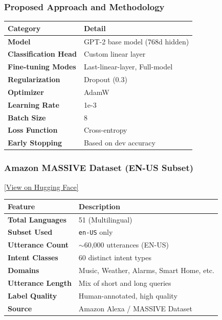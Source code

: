 \documentclass{beamer}
\begin{document}
\begin{frame}
\frametitle{Proposed Approach and Methodology}
\centering
\begin{tabular}{l p{}}
\toprule
\textbf{Category} & \textbf{Detail} \\
\midrule
\textbf{Model} & GPT-2 base model (768d hidden) \\
\textbf{Classification Head} & Custom linear layer \\
\textbf{Fine-tuning Modes} & Last-linear-layer, Full-model \\
\textbf{Regularization} & Dropout (0.3) \\
\midrule
\textbf{Optimizer} & AdamW \\
\textbf{Learning Rate} & 1e-3 \\
\textbf{Batch Size} & 8 \\
\textbf{Loss Function} & Cross-entropy \\
\textbf{Early Stopping} & Based on dev accuracy \\
\bottomrule
\end{tabular}
\end{frame}

\begin{frame}
  \frametitle{Amazon MASSIVE Dataset (EN-US Subset)}

  {\footnotesize \href{https://huggingface.co/datasets/SetFit/amazon_massive_intent_en-US}{[View on Hugging Face]}}
  \vspace{1em}

  \centering
  \begin{tabular}{ll}
  \toprule
  \textbf{Feature} & \textbf{Description} \\
  \midrule
  \textbf{Total Languages} & 51 (Multilingual) \\
  \textbf{Subset Used} & \texttt{en-US} only \\
  \textbf{Utterance Count} & $\sim$60,000 utterances (EN-US) \\
  \textbf{Intent Classes} & 60 distinct intent types \\
  \textbf{Domains} & Music, Weather, Alarms, Smart Home, etc. \\
  \textbf{Utterance Length} & Mix of short and long queries \\
  \textbf{Label Quality} & Human-annotated, high quality \\
  \textbf{Source} & Amazon Alexa / MASSIVE Dataset \\
  \bottomrule
  \end{tabular}
  
\end{frame}
\end{document}
